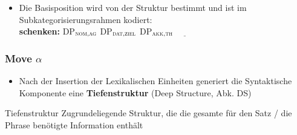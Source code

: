 \begin{frame}

\begin{itemize}
		\item Die Basisposition wird von der Struktur bestimmt und ist im Subkategorisierungsrahmen kodiert:\\
\textbf{schenken:} DP$_{\textsc{nom,ag}}$ DP$_{\textsc{dat,ziel}}$  DP$_{\textsc{akk,th}}$ $\underline{\qquad}$
\end{itemize} 

	\begin{figure}
	\centering
\end{figure}

\end{frame}


\begin{frame}
\frametitle{Move $\alpha$}

\begin{itemize}
	\item Nach der Insertion der Lexikalischen Einheiten generiert die Syntaktische Komponente eine \textbf{Tiefenstruktur} (Deep Structure, Abk. DS)
\end{itemize}

\begin{block}{Tiefenstruktur}
Zugrundeliegende Struktur, die die gesamte für den Satz / die Phrase benötigte Information enthält
\end{block}

\end{frame}


